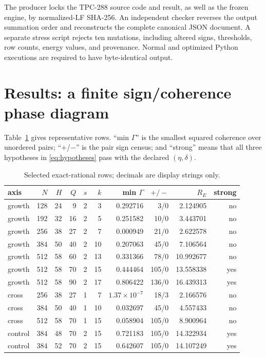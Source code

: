 \documentclass[10pt]{article}
\begin{document}
The producer locks the TPC-288 source code and result, as well as the frozen
engine, by normalized-LF SHA-256.  An independent checker reverses the output
summation order and reconstructs the complete canonical JSON document.  A
separate stress script rejects ten mutations, including altered signs,
thresholds, row counts, energy values, and provenance.  Normal and optimized
Python executions are required to have byte-identical output.

\section{Results: a finite sign/coherence phase diagram}

Table~\ref{tab:representative} gives representative rows.  ``min $\Gamma$''
is the smallest squared coherence over unordered pairs; ``$+$/$-$'' is the
pair sign census; and ``strong'' means that all three hypotheses in
\eqref{eq:hypotheses} pass with the declared $(\eta,\delta)$.

\begin{table}[ht]
\centering
\scriptsize
\begin{tabular}{@{}lrrrrrrrrr@{}}
\toprule
axis & $N$ & $H$ & $Q$ & $s$ & $k$ & min $\Gamma$ & $+/-$ & $R_E$ & strong\\
\midrule
growth &128&24&9 &2&3 &0.292716&3/0&2.124905&no\\
growth &192&32&16&2&5 &0.251582&10/0&3.443701&no\\
growth &256&38&27&2&7 &0.000949&21/0&2.622578&no\\
growth &384&50&40&2&10&0.207063&45/0&7.106564&no\\
growth &512&58&60&2&13&0.331366&78/0&10.992677&no\\
growth &512&58&70&2&15&0.444464&105/0&13.558338&yes\\
growth &512&58&90&2&17&0.806422&136/0&16.439313&yes\\
cross &256&38&27&1&7&$1.37\!\times10^{-7}$&18/3&2.166576&no\\
cross &384&50&40&1&10&0.032697&45/0&4.557433&no\\
cross &512&58&70&1&15&0.058904&105/0&8.900964&no\\
control&384&48&70&2&15&0.721183&105/0&14.322934&yes\\
control&384&52&70&2&15&0.642607&105/0&14.107249&yes\\
\bottomrule
\end{tabular}
\caption{Selected exact-rational rows; decimals are display strings only.}
\label{tab:representative}
\end{table}
\end{document}
